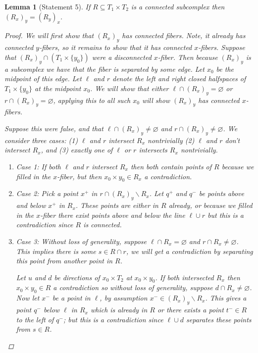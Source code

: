\documentclass{article}
\newcommand{\rxy}{(R_x)_y}
\theoremstyle{mystyle}
\newtheorem{lem}{Lemma}[section]
\theoremstyle{remark}
\begin{document}
\begin{lem}
    [Statement 5]
    If \(R \subseteq T_{1} \times T_{2}\) is a connected subcomplex then \( \left( R_{x} \right)_{y} = \left( R_{y} \right)_{x}\).
    \begin{proof}
        We will first show that \(\rxy\) has connected fibers. Note, it already has connected \(y\)-fibers, so it remains to show that it has connected \(x\)-fibers. Suppose that \(\rxy \cap ( T_{1} \times \{y_{0}\} )\) were a disconnected \(x\)-fiber. Then because \(\rxy\) is a subcomplex we have that the fiber is separated by some edge. Let \(x_{0}\) be the midpoint of this edge. Let \(\ell\) and \(r\) denote the left and right closed halfspaces of \(T_{1} \times \{y_{0}\}\) at the midpoint \(x_{0}\). We will show that either \(\ell \cap \rxy = \varnothing\) or \(r \cap \rxy = \varnothing\), applying this to all such \(x_{0}\) will show \(\rxy\) has connected \(x\)-fibers.
        
        Suppose this were false, and that \(\ell \cap \rxy \neq \varnothing\) and \(r \cap \rxy \neq \varnothing\). We consider three cases: (1) \(\ell\) and \(r\) intersect \(R_{x}\) nontrivially (2) \(\ell\) and \(r\) don't intersect \(R_{x}\), and (3) exactly one of \(\ell\) or \(r\) intersects \(R_{x}\) nontrivially.
        \begin{enumerate}
            \item Case 1: If both \(\ell\) and \(r\) intersect \(R_{x}\) then both contain points of \(R\) because we filled in the \(x\)-fiber, but then \(x_{0} \times y_{0}  \in R_{x}\) a contradiction.
            \item Case 2: Pick a point \(x^+\) in \(r \cap \rxy \smallsetminus R_{x} \). Let \(q^{+}\) and \(q^-\) be points above and below \(x^+\) in \(R_{x}\). These points are either in \(R\) already, or because we filled in the \(x\)-fiber there exist points above and below the line \(\ell \cup r\) but this is a contradiction since \(R\) is connected.
            \item Case 3: Without loss of generality, suppose \(\ell \cap R_{x} = \varnothing\) and \(r \cap R_{x} \neq \varnothing\). This implies there is some \(s \in R \cap r\), we will get a contradiction by separating this point from another point in \(R\). 
                
                Let \(u\) and \(d\) be directions of \(x_{0} \times T_{2}\) at \(x_{0} \times y_{0}\). If both intersected \(R_{x}\) then \(x_{0} \times y_{0} \in R \) a contradiction so without loss of generality, suppose \(d \cap R_{x} \neq \varnothing \). Now let \(x^-\) be a point in \(\ell\), by assumption \(x^- \in \rxy \smallsetminus R_{x} \). This gives a point \(q^-\) below \(\ell\) in \(R_{x}\) which is already in \(R\) or there exists a point \(t^- \in R\) to the left of \(q^-\); but this is a contradiction since \(\ell \cup d\) separates these points from \(s \in R\).
        \end{enumerate}


\end{proof}
\end{lem}
\end{document}
